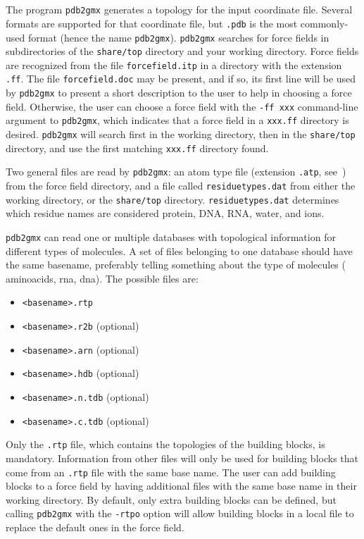 \section{}
\label{sec:pdb2gmxfiles}
The {\gromacs} program {\tt pdb2gmx} generates a topology for
the input coordinate file. Several formats are supported for
that coordinate file, but {\tt *.pdb} is the most commonly-used format
(hence the name {\tt pdb2gmx}).
{\tt pdb2gmx} searches for force fields in subdirectories of the {\gromacs} {\tt share/top}
directory and your working directory. Force fields are recognized from
the file {\tt forcefield.itp} in a directory with the extension {\tt .ff}.
The file {\tt forcefield.doc} may be present, and if so, its first line
will be used by {\tt pdb2gmx} to present a short description to the
user to help in choosing a force field. Otherwise, the user can
choose a force field with the {\tt -ff xxx} command-line argument
to {\tt pdb2gmx}, which indicates that a force field in a
{\tt xxx.ff} directory is desired. {\tt pdb2gmx} will search first in the
working directory, then in the {\gromacs} {\tt share/top} directory, and
use the first matching {\tt xxx.ff} directory found.

Two general files are read by {\tt pdb2gmx}: an atom type file
(extension {\tt .atp}, see~) from the force field directory,
and a file called {\tt residuetypes.dat} from either the working directory, or
the {\gromacs} {\tt share/top} directory. {\tt residuetypes.dat}
determines which residue names are considered protein, DNA, RNA,
water, and ions.

{\tt pdb2gmx} can read one or multiple databases with topological information
for different types of molecules. A set of files belonging to one database
should have the same basename, preferably telling something about the type
of molecules ({\eg} aminoacids, rna, dna). The possible files are:
\begin{itemize}
\item {\tt <basename>.rtp}
\item {\tt <basename>.r2b} (optional)
\item {\tt <basename>.arn} (optional)
\item {\tt <basename>.hdb} (optional)
\item {\tt <basename>.n.tdb} (optional)
\item {\tt <basename>.c.tdb} (optional)
\end{itemize}
Only the {\tt .rtp} file, which contains the topologies of the building
blocks, is mandatory. Information from other files will only be used 
for building blocks that come from an {\tt .rtp} file with the same base name.
The user can add building blocks to a force field by having additional
files with the same base name in their working directory. By default, only
extra building blocks can be defined, but calling {\tt pdb2gmx} with
the {\tt -rtpo} option will allow building blocks in a local file
to replace the default ones in the force field.


